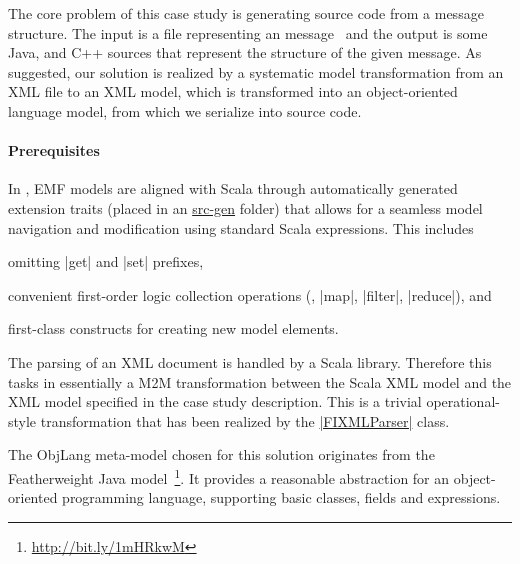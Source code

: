 
\enlargethispage{20mm}

\label{sec:SolutionDescription}

The core problem of this case study is generating source code from a \FIXML message structure.
The input is a file representing an  message~\cite{FIXML2004} and the output is some Java, \Csharp and C++ sources that represent the structure of the given \FIXML message. 
As suggested, our solution is realized by a systematic model transformation from an XML file to an XML model, which is transformed into an object-oriented language model, from which we serialize into source code.

\vspace*{-5mm}
\paragraph{Prerequisites}
%
In \SIGMA, EMF models are aligned with Scala through automatically generated extension traits (placed in an \href{https://github.com/fikovnik/ttc14-fixml-sigma/blob/master/ttc14-fixml-base/src-gen}{src-gen} folder) that allows for a seamless model navigation and modification using standard Scala expressions.
This includes
%
\begin{inparaitem}[]
  \item omitting \Scala|get| and \Scala|set| prefixes,
  \item convenient first-order logic collection operations (\Eg, \Scala|map|, \Scala|filter|, \Scala|reduce|), and
  \item first-class constructs for creating new model elements.
\end{inparaitem}


The parsing of an XML document is handled by a Scala library. 
Therefore this tasks in essentially a M2M transformation between the Scala XML model and the XML model specified in the case study description.
This is a trivial operational-style transformation that has been realized by the \href{https://github.com/fikovnik/ttc14-fixml-sigma/blob/master/ttc14-fixml-base/src/fr/inria/spirals/sigma/ttc14/fixml/FIXMLParser.scala}{\Scala|FIXMLParser|} class.


\enlargethispage{20mm}

The ObjLang meta-model chosen for this solution originates from the Featherweight Java model~\footnote{\url{http://bit.ly/1mHRkwM}}. It provides a reasonable abstraction for an object-oriented programming language, supporting basic classes, fields and expressions.


